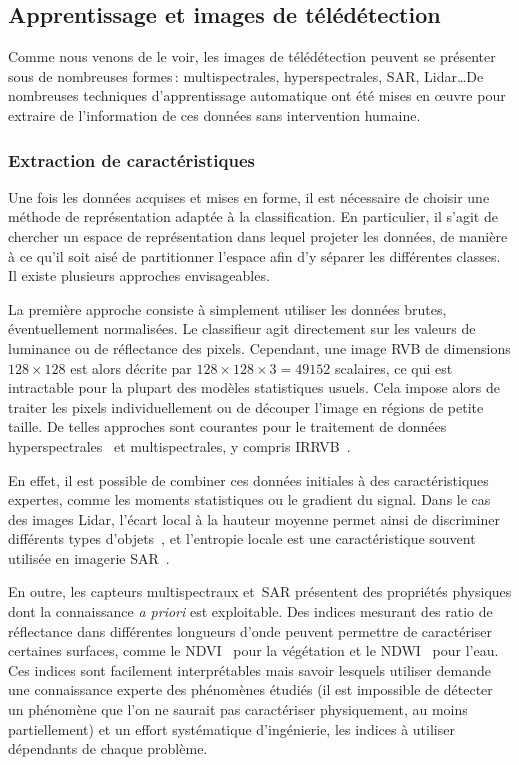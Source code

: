\subsection{Apprentissage et images de télédétection}

Comme nous venons de le voir, les images de télédétection peuvent se présenter sous de nombreuses formes\,: multispectrales, hyperspectrales, \gls{SAR}, \gls{Lidar}\dots De nombreuses techniques d'apprentissage automatique ont été mises en \oe{}uvre pour extraire de l'information de ces données sans intervention humaine.

\subsubsection{Extraction de caractéristiques}

Une fois les données acquises et mises en forme, il est nécessaire de choisir une méthode de représentation adaptée à la classification. En particulier, il s'agit de chercher un espace de représentation dans lequel projeter les données, de manière à ce qu'il soit aisé de partitionner l'espace afin d'y séparer les différentes classes. Il existe plusieurs approches envisageables.

La première approche consiste à simplement utiliser les données brutes, éventuellement normalisées. Le classifieur agit directement sur les valeurs de luminance ou de réflectance des pixels. Cependant, une image \gls{RVB} de dimensions $128\times128$ est alors décrite par $128\times128\times3 = 49152$ scalaires, ce qui est intractable pour la plupart des modèles statistiques usuels. Cela impose alors de traiter les pixels individuellement ou de découper l'image en régions de petite taille. De telles approches sont courantes pour le traitement de données hyperspectrales~\cite{fauvel_advances_2013,ham_investigation_2005} et multispectrales, y compris \gls{IRRVB}~\cite{dechesne_semantic_2017}.

En effet, il est possible de combiner ces données initiales à des caractéristiques expertes, comme les moments statistiques ou le gradient du signal. Dans le cas des images \gls{Lidar}, l'écart local à la hauteur moyenne permet ainsi de discriminer différents types d'objets~\cite{guo_relevance_2011,li_lidar_2017}, et l'entropie locale est une caractéristique souvent utilisée en imagerie \gls{SAR}~\cite{g._barber_sar_1991}.

En outre, les capteurs multispectraux et \gls{SAR} présentent des propriétés physiques dont la connaissance \emph{a priori} est exploitable. Des indices mesurant des ratio de réflectance dans différentes longueurs d'onde peuvent permettre de caractériser certaines surfaces, comme le \gls{NDVI}~\cite{rouse_monitoring_1974} pour la végétation et le \gls{NDWI}~\cite{xie_new_2014} pour l'eau. Ces indices sont facilement interprétables mais savoir lesquels utiliser demande une connaissance experte des phénomènes étudiés (il est impossible de détecter un phénomène que l'on ne saurait pas caractériser physiquement, au moins partiellement) et un effort systématique d'ingénierie, les indices à utiliser dépendants de chaque problème.

